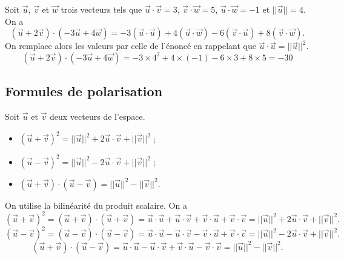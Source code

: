\documentclass[11pt,fleqn, openany]{book} %
\begin{document}
\begin{example} Soit $\vec u$, $\vec v$ et $\vec w$ trois vecteurs tels que $\vec u \cdot \vec v = 3$, $\vec v \cdot \vec w=5$, $\vec u \cdot \vec w = -1$ et $\lvert\lvert\vec u\rvert\rvert=4$. On a
\[ (\vec u + 2\vec v) \cdot (-3\vec u + 4 \vec w)=-3 (\vec u \cdot \vec u) + 4 (\vec u \cdot \vec w) - 6 (\vec v \cdot \vec u) + 8 (\vec v \cdot \vec w).\]
On remplace alors les valeurs par celle de l'énoncé en rappelant que $\vec u \cdot \vec u = \lvert\lvert\vec u\rvert\rvert^2$.
\[ (\vec u + 2\vec v) \cdot (-3\vec u + 4 \vec w)=-3 \times 4^2 + 4 \times (-1) - 6 \times 3 + 8\times 5=-30\]\vspace{-0.5cm}\end{example}

\subsection{Formules de polarisation}

\begin{proposition}Soit $\vec u$ et $\vec v$ deux vecteurs de l'espace.
\begin{itemize}
\item $(\vec{u}+\vec{v})^2=\lvert\lvert\vec{u}\rvert\rvert^2+2\vec{u}\cdot\vec{v}+\lvert\lvert\vec{v}\rvert\rvert^2$ ;
\item $(\vec{u}-\vec{v})^2=\lvert\lvert\vec{u}\rvert\rvert^2-2\vec{u}\cdot\vec{v}+\lvert\lvert\vec{v}\rvert\rvert^2$ ;
\item $(\vec{u}+\vec{v})\cdot (\vec{u}-\vec{v})=\lvert\lvert\vec{u}\rvert\rvert^2-\lvert\lvert\vec{v}\rvert\rvert^2$.
\end{itemize}\end{proposition}

\begin{demonstration} On utilise la bilinéarité du produit scalaire. On a\[(\vec{u}+\vec{v})^2 =  (\vec{u}+\vec{v}) \cdot (\vec{u}+\vec{v})= \vec{u}\cdot\vec{u}+\vec{u}\cdot \vec{v}+\vec{v}\cdot\vec{u}+\vec{v}\cdot \vec{v}=\lvert\lvert\vec{u}\rvert\rvert^2+2\vec{u}\cdot\vec{v}+\lvert\lvert\vec{v}\rvert\rvert^2.\]
\[(\vec{u}-\vec{v})^2 =  (\vec{u}-\vec{v}) \cdot (\vec{u}-\vec{v})= \vec{u}\cdot\vec{u}-\vec{u}\cdot \vec{v}-\vec{v}\cdot\vec{u}+\vec{v}\cdot \vec{v}=\lvert\lvert\vec{u}\rvert\rvert^2-2\vec{u}\cdot\vec{v}+\lvert\lvert\vec{v}\rvert\rvert^2.\]
\[(\vec{u}+\vec{v})\cdot (\vec{u}-\vec{v})= \vec{u}\cdot\vec{u}-\vec{u}\cdot \vec{v}+\vec{v}\cdot\vec{u}-\vec{v}\cdot \vec{v}=\lvert\lvert\vec{u}\rvert\rvert^2-\lvert\lvert\vec{v}\rvert\rvert^2.\]
\end{demonstration}
\end{document}
